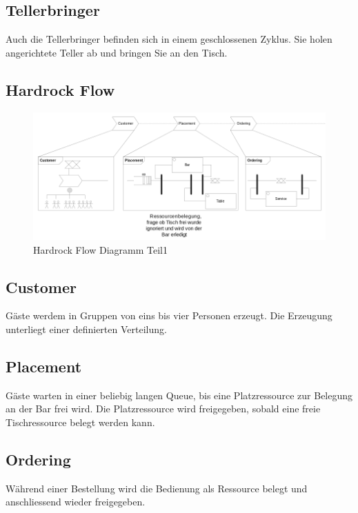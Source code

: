 \documentclass[ngerman,a4paper,12pt]{scrreprt}
\begin{document}
		\subsection{Tellerbringer}
		Auch die Tellerbringer befinden sich in einem geschlossenen Zyklus. Sie holen angerichtete Teller ab und bringen Sie an den Tisch.
		

\begin{landscape}
	\section{Hardrock Flow}
		\begin{figure}[H]
			\centering
				\includegraphics[width=1.4\textwidth]{img/flowDiagramm1-v1.png}
				\caption[Hardrock Flow Diagramm Teil1]{Hardrock Flow Diagramm Teil1}
				\label{flowDiagramm1}
		\end{figure}
		
		\subsection{Customer}
		Gäste werdem in Gruppen von eins bis vier Personen erzeugt. Die Erzeugung unterliegt einer definierten Verteilung.
		
		\subsection{Placement}
		Gäste warten in einer beliebig langen Queue, bis eine Platzressource zur Belegung an der Bar frei wird. Die Platzressource wird freigegeben, sobald eine freie Tischressource belegt werden kann.
		
		\subsection{Ordering}
		Während einer Bestellung wird die Bedienung als Ressource belegt und anschliessend wieder freigegeben.
		

\end{landscape}
\end{document}
